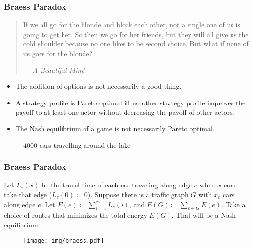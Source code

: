 \documentclass[UTF8,11pt,colorlinks,compress,openany]{beamer}%
\begin{document}
\begin{frame}\frametitle{Braess Paradox}
\begin{quote}
If we all go for the blonde and block each other, not a single one of us is going to get her. So then we go for her friends, but they will all give us the cold shoulder because no one likes to be second choice. But what if none of us goes for the blonde?\par\hfill --- \textsl{A Beautiful Mind}
\end{quote}\vspace{-4pt}
\begin{itemize}
	\item The addition of options is not necessarily a good thing.
	\item A strategy profile is Pareto optimal iff no other strategy profile improves the payoff to at least one actor without decreasing the payoff of other actors.
	\item The Nash equilibrium of a game is not necessarily Pareto optimal.
\end{itemize}
\begin{figure}[H]
\qquad
{}\caption{$4000$ cars travelling around the lake}
\end{figure}
\end{frame}

\begin{frame}\frametitle{Braess Paradox}
Let $L_e(x)$ be the travel time of each car traveling along edge $e$ when $x$ cars take that edge ($L_e(0)\coloneqq 0$). Suppose there is a traffic graph $G$ with $x_e$ cars along edge $e$. Let $E(e)\coloneqq \sum_{i=1}^{x_e} L_e(i)$, and $E(G)\coloneqq \sum_{e\in G}E(e)$. Take a choice of routes that minimizes the total energy $E(G)$. That will be a Nash equilibrium.\vspace{-2pt}
\begin{figure}
	\texttt{[image: img/braess.pdf]}
\end{figure}
\end{frame}
\end{document}
